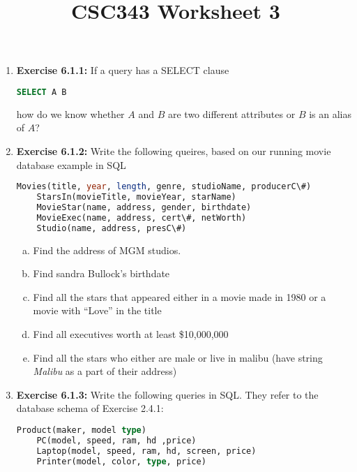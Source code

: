 \documentclass[12pt]{article}
\begin{document}
\title{CSC343 Worksheet 3}
\maketitle

\bigskip


\begin{enumerate}[1.]
   \item \textbf{Exercise 6.1.1:} If a query has a SELECT clause

   \begin{lstlisting}[language=SQL]
    SELECT A B
    \end{lstlisting}

    how do we know whether $A$ and $B$ are two different attributes or $B$ is an
    alias of $A$?

    \item \textbf{Exercise 6.1.2:} Write the following queires, based on our running movie
    database example in SQL

    \begin{lstlisting}[language=SQL]
    Movies(title, year, length, genre, studioName, producerC\#)
    StarsIn(movieTitle, movieYear, starName)
    MovieStar(name, address, gender, birthdate)
    MovieExec(name, address, cert\#, netWorth)
    Studio(name, address, presC\#)
    \end{lstlisting}

    \bigskip

    \begin{enumerate}[a)]
        \item Find the address of MGM studios.
        \item Find sandra Bullock's birthdate
        \item Find all the stars that appeared either in a movie made in 1980 or a movie with ``Love'' in the title
        \item Find all executives worth at least \$10,000,000
        \item Find all the stars who either are male or live in malibu (have
        string \textit{Malibu} as a part of their address)
    \end{enumerate}

    \item \textbf{Exercise 6.1.3:} Write the following queries in SQL. They refer
    to the database schema of Exercise 2.4.1:

    \bigskip

    \begin{lstlisting}[language=SQL]
    Product(maker, model type)
    PC(model, speed, ram, hd ,price)
    Laptop(model, speed, ram, hd, screen, price)
    Printer(model, color, type, price)
    \end{lstlisting}


\end{enumerate}
\end{document}
